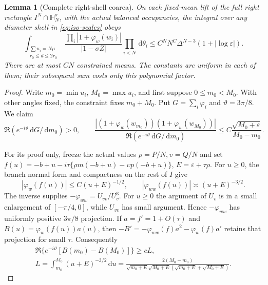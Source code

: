 \documentclass[11pt]{article}
\numberwithin{equation}{section}
\newtheorem{lemma}[theorem]{Lemma}
\theoremstyle{definition}
\newcommand{\dd}{\,\mathrm d}
\newcommand{\eps}{\varepsilon}
\begin{document}
\begin{lemma}[Complete right-shell coarea]\label{lem:iso-coarea}
On each fixed-mean lift of the full right rectangle
$I^N\cap\mathbb H_N^\sigma$, with the actual balanced occupancies,
the integral over any diameter shell in \eqref{eq:iso-scales} obeys
\begin{equation}\label{eq:iso-shell-coarea}
 \int_{\substack{\sum u_i=N\mu\\r_0\le d\le2r_0}}
  \frac{\prod_i|1+\varphi_w(w_i)|}{|1-\sigma Z|}
       \prod_{i<N}\dd\theta_i
 \le C^NN^C\Delta^{N-3}(1+|\log\eps|).
\end{equation}
There are at most $CN$ constrained means.  The constants are uniform
in each of them; their subsequent sum costs only this polynomial
factor.
\end{lemma}
\begin{proof}
Write $m_0=\min u_i$, $M_0=\max u_i$, and first suppose
$0\le m_0<M_0$.  With other angles fixed, the constraint fixes
$m_0+M_0$.  Put $G=\sum_i\varphi_i$ and $\vartheta=3\pi/8$.
We claim
\begin{equation}\label{eq:iso-extreme-ratio}
 \Re(e^{-i\vartheta}\dd G/\dd m_0)>0,\qquad
 \frac{|(1+\varphi_w(w_{m_0}))(1+\varphi_w(w_{M_0}))|}
      {\Re(e^{-i\vartheta}\dd G/\dd m_0)}
 \le C\frac{\sqrt{M_0+\eps}}{M_0-m_0}.
\end{equation}

For its proof only, freeze the actual values $\rho=P/N,\upsilon=Q/N$
and set
$f(u)=-b+u-i\tau\{\rho m(-b+u)-\upsilon p(-b+u)\}$,
$E=\eps+\tau\rho$.  For $u\ge0$, the branch normal form and
compactness on the rest of $I$ give
\[
 |\varphi_w(f(u))|\le C(u+E)^{-1/2},\qquad
 |\varphi_{ww}(f(u))|\asymp(u+E)^{-3/2}.
\]
The inverse supplies
$-\varphi_{ww}=U_{vv}/U_v^3$.  For $u\ge0$ the argument of $U_v$
is in a small enlargement of $[-\pi/4,0]$, while $U_{vv}$ has small
argument.  Hence $-\varphi_{ww}$ has uniformly positive
$3\pi/8$ projection.  If $a=f'=1+O(\tau)$ and
$B(u)=\varphi_w(f(u))a(u)$, then
$-B'=-\varphi_{ww}(f)a^2-\varphi_w(f)a'$ retains that projection
for small $\tau$.  Consequently
\begin{equation}\label{eq:iso-fixed-occupancy-curvature}
 \begin{gathered}
 \Re\{e^{-i\vartheta}[B(m_0)-B(M_0)]\}\ge cL,
 \\
 L=\int_{m_0}^{M_0}(u+E)^{-3/2}\dd u
 =\frac{2(M_0-m_0)}{\sqrt{m_0+E}\sqrt{M_0+E}
                         (\sqrt{m_0+E}+\sqrt{M_0+E})}.
 \end{gathered}
\end{equation}


\end{proof}
\end{document}
